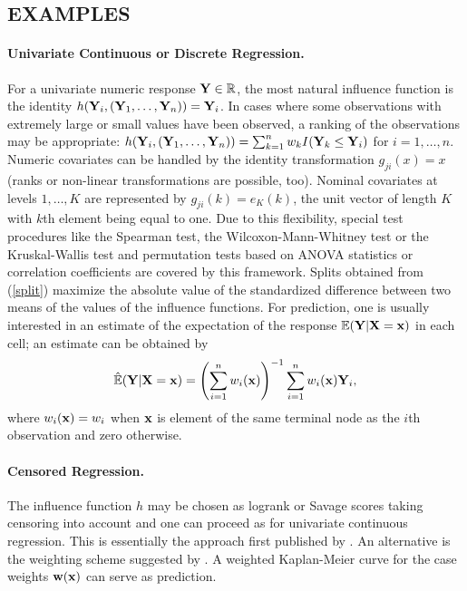 \begin{center}
\section{EXAMPLES \label{examples}}
\end{center}

\paragraph{Univariate Continuous or Discrete Regression.}
For a univariate numeric response $\mathbf{Y} \in \mathbb{R}$, the most natural influence function
is the identity $h(\mathbf{Y}_i, (\mathbf{Y}_1, \dots, \mathbf{Y}_n)) = \mathbf{Y}_i$. 
In cases where some observations with extremely large or small values have been
observed, a
ranking of the observations may be appropriate:
$h(\mathbf{Y}_i, (\mathbf{Y}_1, \dots, \mathbf{Y}_n)) = \sum_{k=1}^n w_k I(\mathbf{Y}_k \le \mathbf{Y}_i)$ for $i = 1, \dots,
n$.
Numeric covariates can be handled by the identity transformation 
$g_{ji}(x) = x$ (ranks or non-linear transformations are possible, too). 
Nominal covariates at levels $1, \dots, K$ are
represented by $g_{ji}(k) = e_K(k)$, the unit vector of length $K$ with
$k$th element being equal to one. Due to this flexibility, special test 
procedures like the Spearman test, the 
Wilcoxon-Mann-Whitney test or the Kruskal-Wallis test and permutation tests
based on ANOVA statistics or correlation coefficients
are covered by this framework. Splits obtained from (\ref{split}) maximize the
absolute value of the standardized difference between two means of the
values of the influence functions. 
For prediction, one is usually interested in an estimate of 
the expectation of
the response $\mathbb{E}(\mathbf{Y} | \mathbf{X} = \mathbf{x})$ in each cell; an estimate 
can be obtained by 
\begin{eqnarray*}
\hat{\mathbb{E}}(\mathbf{Y} | \mathbf{X} = \mathbf{x}) = \left(\sum_{i=1}^n w_i(\mathbf{x})\right)^{-1} \sum_{i=1}^n
w_i(\mathbf{x}) \mathbf{Y}_i,
\end{eqnarray*}
where $w_i(\mathbf{x}) = w_i$ when $\mathbf{x}$ is element of the same terminal node as the $i$th observation
and zero otherwise.

\paragraph{Censored Regression.}
The influence function $h$ may be chosen as 
logrank or Savage scores taking censoring into
account and one can proceed as for univariate continuous regression. This is
essentially the approach first published by \cite{regression:1988}. 
An alternative is the weighting scheme suggested by
\cite{MolinaroDudiotvdLaan2003}. A weighted Kaplan-Meier curve for the case
weights $\mathbf{w}(\mathbf{x})$ can serve as prediction. 

